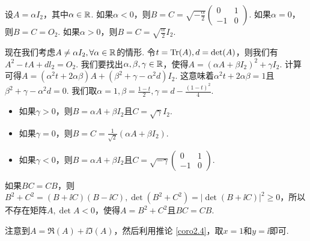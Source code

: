 \begin{solution}
  \begin{inparaenum}[(a)]
    \item 设$A=\alpha I_2$，其中$\alpha\in \mathbb R$. 如果$\alpha<0$，则$B=C=\sqrt{-\frac\alpha2}\begin{pmatrix}
          0 & 1 \\
          -1 & 0
        \end{pmatrix}$. 如果$\alpha=0$，则$B=C=O_2$. 如果$\alpha>0$，则$B=C=\sqrt{\frac\alpha2}I_2$.

        现在我们考虑$A\ne\alpha I_2,\forall \alpha\in\mathbb R$的情形. 令$t=\operatorname{Tr}(A),d=\det(A)$，则我们有$A^2-tA+dl_2=O_2$. 我们要找出$\alpha,\beta,\gamma\in\mathbb R$，使得$A=(\alpha A+\beta I_2)^2+\gamma I_2$. 计算可得$A=(\alpha^2t+2\alpha\beta)A+(\beta^2+\gamma-\alpha^2
        d)I_2$. 这意味着$\alpha^2t+2\alpha\beta=1$且
        $\beta^2+\gamma-\alpha^2d=0$. 我们取$\alpha=1,\beta=\frac{1-t}2,\gamma=d-\frac{(1-t)^2}4$.

  \end{inparaenum}
        \begin{itemize}
          \item 如果$\gamma>0$，则$B=\alpha A+\beta I_2$且$C=\sqrt\gamma I_2$.
          \item 如果$\gamma=0$，则$B=C=\frac1{\sqrt2}(\alpha
              A+\beta I_2)$.
          \item 如果$\gamma<0$，则$B=\alpha A+\beta I_2$且$C=\sqrt{-\gamma}\begin{pmatrix}
                0 & 1 \\
                -1 & 0
              \end{pmatrix}$.
        \end{itemize}

  \begin{enuma}
    \setcounter{enumi}{1}
    \item 如果$BC=CB$，则$B^2+C^2=(B+\ii C)(B-\ii C),\det (B^2+C^2)=|\det(B+\ii C)|^2\ge0$，所以不存在矩阵$A,\det A<0$，使得$A=B^2+C^2$且$BC=CB$.
  \end{enuma}
\end{solution}

\begin{solution}
  注意到$A=\Re(A)+\ii\Im(A)$，然后利用推论 \ref{coro2.4}，取$x=1$和$y=\ii$即可.
\end{solution}

